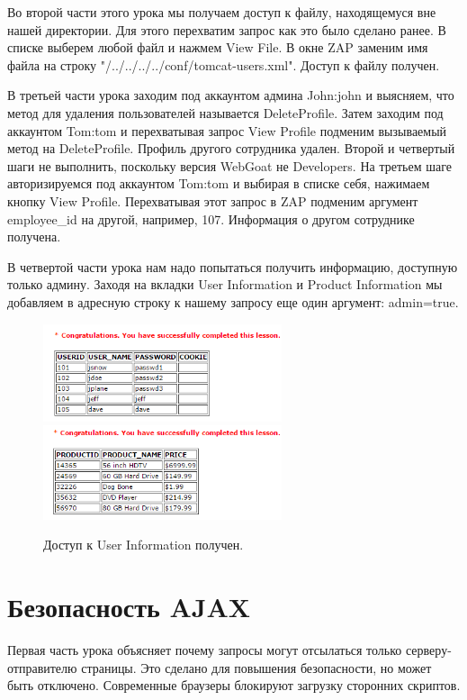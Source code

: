 \documentclass[utf8x, 12pt]{G7-32}
\begin{document}
Во второй части этого урока мы получаем доступ к файлу, находящемуся вне нашей директории. Для этого перехватим запрос как это было сделано ранее. В списке выберем любой файл и нажмем View File. В окне ZAP заменим имя файла на строку "/../../../../conf/tomcat-users.xml". Доступ к файлу получен.

В третьей части урока заходим под аккаунтом админа John:john и выясняем, что метод для удаления пользователей называется DeleteProfile. Затем заходим под аккаунтом Tom:tom и перехватывая запрос View Profile подменим вызываемый метод на DeleteProfile. Профиль другого сотрудника удален. 
Второй и четвертый шаги не выполнить, поскольку версия WebGoat не Developers. На третьем шаге авторизируемся под аккаунтом Tom:tom и выбирая в списке себя, нажимаем кнопку View Profile. Перехватывая этот запрос в ZAP подменим аргумент employee\_id на другой, например, 107. Информация о другом сотруднике получена.

В четвертой части урока нам надо попытаться получить информацию, доступную только админу. Заходя на вкладки User Information и Product Information мы добавляем в адресную строку к нашему запросу еще один аргумент: admin=true.


\begin{figure}[hhh!]
\centering
\includegraphics[width=7cm]{rsrc/3_1}
\includegraphics[width=7cm]{rsrc/3_2}
\caption{Доступ к User Information получен.}
\end{figure}

\newpage
\section{Безопасность AJAX}
Первая часть урока объясняет почему запросы могут отсылаться только серверу-отправителю страницы. Это сделано для повышения безопасности, но может быть отключено. Современные браузеры блокируют загрузку сторонних скриптов. 
\end{document}
